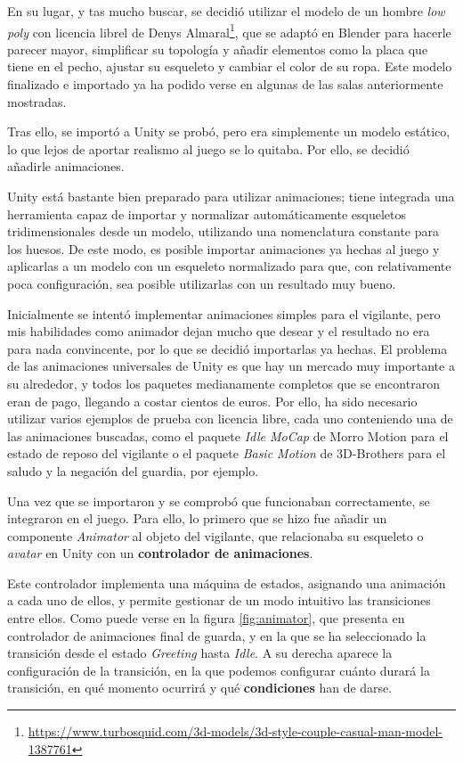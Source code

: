 En su lugar, y tas mucho buscar, se decidió utilizar el modelo de un hombre \textit{low poly} con licencia librel de Denys Almaral\footnote{\url{https://www.turbosquid.com/3d-models/3d-style-couple-casual-man-model-1387761}}, que se adaptó en Blender para hacerle parecer mayor, simplificar su topología y añadir elementos como la placa que tiene en el pecho, ajustar su esqueleto y cambiar el color de su ropa. Este modelo finalizado e importado ya ha podido verse en algunas de las salas anteriormente mostradas.

Tras ello, se importó a Unity se probó, pero era simplemente un modelo estático, lo que lejos de aportar realismo al juego se lo quitaba. Por ello, se decidió añadirle animaciones.

Unity está bastante bien preparado para utilizar animaciones; tiene integrada una herramienta capaz de importar y normalizar automáticamente esqueletos tridimensionales desde un modelo, utilizando una nomenclatura constante para los huesos. De este modo, es posible importar animaciones ya hechas al juego y aplicarlas a un modelo con un esqueleto normalizado para que, con relativamente poca configuración, sea posible utilizarlas con un resultado muy bueno.

Inicialmente se intentó implementar animaciones simples para el vigilante, pero mis habilidades como animador dejan mucho que desear y el resultado no era para nada convincente, por lo que se decidió importarlas ya hechas. El problema de las animaciones universales de Unity es que hay un mercado muy importante a su alrededor, y todos los paquetes medianamente completos que se encontraron eran de pago, llegando a costar cientos de euros. Por ello, ha sido necesario utilizar varios ejemplos de prueba con licencia libre, cada uno conteniendo una de las animaciones buscadas, como el paquete \textit{Idle MoCap} de Morro Motion para el estado de reposo del vigilante o el paquete \textit{Basic Motion} de 3D-Brothers para el saludo y la negación del guardia, por ejemplo.

Una vez que se importaron y se comprobó que funcionaban correctamente, se integraron en el juego. Para ello, lo primero que se hizo fue añadir un componente \textit{Animator} al objeto del vigilante, que relacionaba su esqueleto o \textit{avatar} en Unity con un \textbf{controlador de animaciones}.

Este controlador implementa una máquina de estados, asignando una animación a cada uno de ellos, y permite gestionar de un modo intuitivo las transiciones entre ellos. Como puede verse en la figura \ref{fig:animator}, que presenta en controlador de animaciones final de guarda, y en la que se ha seleccionado la transición desde el estado \textit{Greeting} hasta \textit{Idle}. A su derecha aparece la configuración de la transición, en la que podemos configurar cuánto durará la transición, en qué momento ocurrirá y qué \textbf{condiciones} han de darse.

